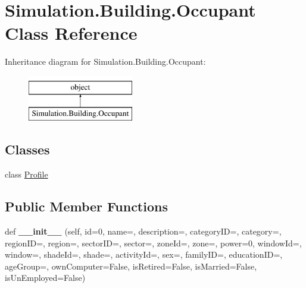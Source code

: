 \hypertarget{class_c_simulation_1_1_simulation_1_1_building_1_1_occupant}{}\section{Simulation.\+Building.\+Occupant Class Reference}
\label{class_c_simulation_1_1_simulation_1_1_building_1_1_occupant}
Inheritance diagram for Simulation.\+Building.\+Occupant\+:\begin{figure}[H]
\begin{center}
\leavevmode
\includegraphics[height=2.000000cm]{class_c_simulation_1_1_simulation_1_1_building_1_1_occupant}
\end{center}
\end{figure}
\subsection*{Classes}
\begin{DoxyCompactItemize}
\item 
class \hyperlink{class_c_simulation_1_1_simulation_1_1_building_1_1_occupant_1_1_profile}{Profile}
\end{DoxyCompactItemize}
\subsection*{Public Member Functions}
\begin{DoxyCompactItemize}
\item 
\mbox{\label{class_c_simulation_1_1_simulation_1_1_building_1_1_occupant_a4d48efcfaf9fc91f267e7cf2ba652d49}} 
def {\bfseries \+\_\+\+\_\+init\+\_\+\+\_\+} (self, id=0, name=\textquotesingle{}\textquotesingle{}, description=\textquotesingle{}\textquotesingle{}, category\+ID=\textquotesingle{}\textquotesingle{}, category=\textquotesingle{}\textquotesingle{}, region\+ID=\textquotesingle{}\textquotesingle{}, region=\textquotesingle{}\textquotesingle{}, sector\+ID=\textquotesingle{}\textquotesingle{}, sector=\textquotesingle{}\textquotesingle{}, zone\+Id=\textquotesingle{}\textquotesingle{}, zone=\textquotesingle{}\textquotesingle{}, power=0, window\+Id=\textquotesingle{}\textquotesingle{}, window=\textquotesingle{}\textquotesingle{}, shade\+Id=\textquotesingle{}\textquotesingle{}, shade=\textquotesingle{}\textquotesingle{}, activity\+Id=\textquotesingle{}\textquotesingle{}, sex=\textquotesingle{}\textquotesingle{}, family\+ID=\textquotesingle{}\textquotesingle{}, education\+ID=\textquotesingle{}\textquotesingle{}, age\+Group=\textquotesingle{}\textquotesingle{}, own\+Computer=False, is\+Retired=False, is\+Married=False, is\+Un\+Employed=False)
\end{DoxyCompactItemize}
